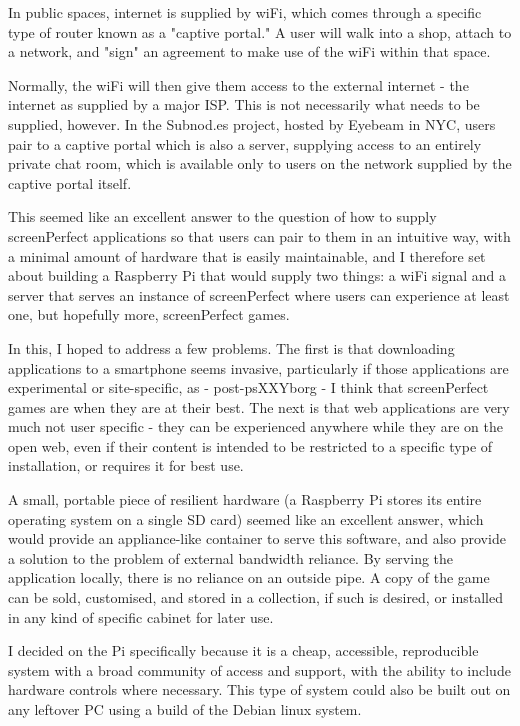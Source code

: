 In public spaces, internet is supplied by wiFi, which comes through a specific type of router known as a "captive portal." A user will walk into a shop, attach to a network, and "sign" an agreement to make use of the wiFi within that space. 

Normally, the wiFi will then give them access to the external internet - the internet as supplied by a major ISP. This is not necessarily what needs to be supplied, however. In the Subnod.es project, hosted by Eyebeam in NYC, users pair to a captive portal which is also a server, supplying access to an entirely private chat room, which is available only to users on the network supplied by the captive portal itself. 

This seemed like an excellent answer to the question of how to supply screenPerfect applications so that users can pair to them in an intuitive way, with a minimal amount of hardware that is easily maintainable, and I therefore set about building a Raspberry Pi that would supply two things: a wiFi signal and a server that serves an instance of screenPerfect where users can experience at least one, but hopefully more, screenPerfect games. 

In this, I hoped to address a few problems. The first is that downloading applications to a smartphone seems invasive, particularly if those applications are experimental or site-specific, as - post-psXXYborg - I think that screenPerfect games are when they are at their best. The next is that web applications are very much not user specific - they can be experienced anywhere while they are on the open web, even if their content is intended to be restricted to a specific type of installation, or requires it for best use. 

A small, portable piece of resilient hardware (a Raspberry Pi stores its entire operating system on a single SD card) seemed like an excellent answer, which would provide an appliance-like container to serve this software, and also provide a solution to the problem of external bandwidth reliance. By serving the application locally, there is no reliance on an outside pipe. A copy of the game can be sold, customised, and stored in a collection, if such is desired, or installed in any kind of specific cabinet for later use. 

I decided on the Pi specifically because it is a cheap, accessible, reproducible system with a broad community of access and support, with the ability to include hardware controls where necessary. This type of system could also be built out on any leftover PC using a build of the Debian linux system.

